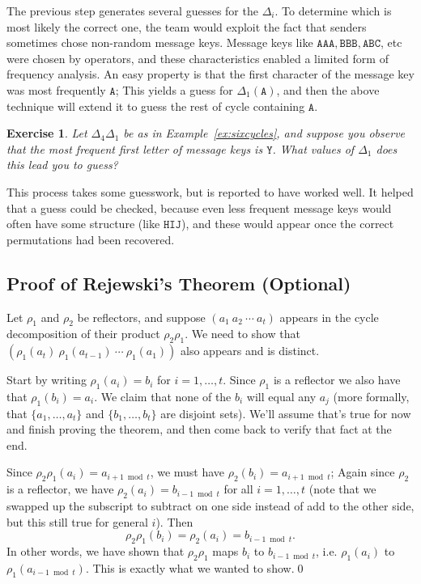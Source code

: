 \documentclass[11pt]{article}
\newtheorem{exercise}{Exercise}
\begin{document}
The previous step generates several guesses for the $\Delta_i$. To
determine which is most likely the correct one, the team would exploit
the fact that senders sometimes chose non-random message keys. Message
keys like $\mathtt{AAA},\mathtt{BBB},\mathtt{ABC}$, etc were chosen
by operators, and these characteristics enabled a limited form of 
frequency analysis. An easy property is that the first character of the
message key was most frequently $\mathtt{A}$; This yields a guess for
$\Delta_1(\mathtt{A})$, and then the above technique will extend it to
guess the rest of cycle containing $\mathtt{A}$.
\begin{exercise}
    Let $\Delta_4\Delta_1$ be as in Example~\ref{ex:sixcycles}, and suppose
    you observe that the most frequent first letter of message keys is
    $\mathtt{Y}$. What values of $\Delta_1$ does this lead you to guess?
\end{exercise}
This process takes some guesswork, but is reported to have worked well.
It helped that a guess could be checked, because even less frequent message
keys would often have some structure (like $\mathtt{HIJ}$), and these would
appear once the correct permutations had been recovered.

\subsection{Proof of Rejewski's Theorem (Optional)}

Let $\rho_1$ and $\rho_2$ be reflectors, and suppose $(a_1\ a_2\ \cdots\ a_t)$
appears in the cycle decomposition of their product $\rho_2\rho_1$. We need to
show that   $(\rho_1(a_t)\ \rho_1(a_{t-1})\ \cdots\ \rho_1(a_1))$ also
appears and is distinct.

Start by writing $\rho_1(a_i) = b_i$ for $i=1,\ldots,t$.
Since $\rho_1$ is a reflector we also have that $\rho_1(b_i) = a_i$.
We claim that none of
the $b_i$ will equal any $a_j$ (more formally, that $\{a_1,\ldots,a_t\}$ and
$\{b_1,\ldots,b_t\}$ are disjoint sets). We'll assume that's true for now and
finish proving the theorem, and then come back to verify that fact at the end.

Since $\rho_2\rho_1(a_i) = a_{i+1\bmod t}$, we must have $\rho_2(b_i) =
a_{i+1\bmod t}$; Again since $\rho_2$ is a reflector, we have
$\rho_2(a_i) = b_{i-1\bmod t}$ for all $i=1,\ldots,t$ (note that we swapped up
the subscript to subtract on one side instead of add to the other side, but
this still true for general $i$).  Then
\[
    \rho_2\rho_1(b_i) = 
    \rho_2(a_i) = b_{i-1\bmod t}.
\]
In other words, we have shown that $\rho_2\rho_1$ maps $b_i$ to $b_{i-1\bmod
t}$, i.e. $\rho_1(a_i)$ to $\rho_1(a_{i-1\bmod t})$. This is exactly what we
wanted to show.\qed
\end{document}
